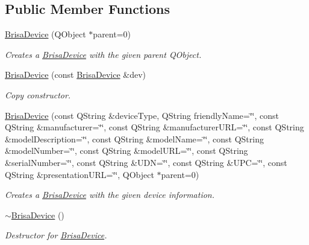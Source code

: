\subsection*{Public Member Functions}
\begin{DoxyCompactItemize}
\item 
\hyperlink{classBrisaUpnp_1_1BrisaDevice_a110578dfd7f899ad6406e0337a1434d0}{BrisaDevice} (QObject $\ast$parent=0)
\begin{DoxyCompactList}\small\item\em Creates a \hyperlink{classBrisaUpnp_1_1BrisaDevice}{BrisaDevice} with the given parent QObject. \item\end{DoxyCompactList}\item 
\hyperlink{classBrisaUpnp_1_1BrisaDevice_a9a83ceccb6b9e6f1ac472e3124107d2f}{BrisaDevice} (const \hyperlink{classBrisaUpnp_1_1BrisaDevice}{BrisaDevice} \&dev)
\begin{DoxyCompactList}\small\item\em Copy constructor. \item\end{DoxyCompactList}\item 
\hyperlink{classBrisaUpnp_1_1BrisaDevice_ab84c880091eb451d28ae025082687dca}{BrisaDevice} (const QString \&deviceType, QString friendlyName=\char`\"{}\char`\"{}, const QString \&manufacturer=\char`\"{}\char`\"{}, const QString \&manufacturerURL=\char`\"{}\char`\"{}, const QString \&modelDescription=\char`\"{}\char`\"{}, const QString \&modelName=\char`\"{}\char`\"{}, const QString \&modelNumber=\char`\"{}\char`\"{}, const QString \&modelURL=\char`\"{}\char`\"{}, const QString \&serialNumber=\char`\"{}\char`\"{}, const QString \&UDN=\char`\"{}\char`\"{}, const QString \&UPC=\char`\"{}\char`\"{}, const QString \&presentationURL=\char`\"{}\char`\"{}, QObject $\ast$parent=0)
\begin{DoxyCompactList}\small\item\em Creates a \hyperlink{classBrisaUpnp_1_1BrisaDevice}{BrisaDevice} with the given device information. \item\end{DoxyCompactList}\item 
\hyperlink{classBrisaUpnp_1_1BrisaDevice_a335a9375c0ae31e3182284b89e093fba}{$\sim$BrisaDevice} ()
\begin{DoxyCompactList}\small\item\em Destructor for \hyperlink{classBrisaUpnp_1_1BrisaDevice}{BrisaDevice}. \item\end{DoxyCompactList}\item 

\end{DoxyCompactItemize}
